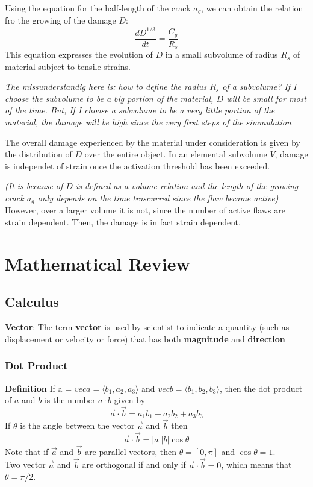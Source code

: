 \documentclass[10pt, twocolumn]{thesis}
\begin{document}
Using the equation for the half-length of the crack $a_g$, we can obtain the relation fro the growing of the damage $D$:
\[\frac{dD^{1/3}}{dt}=\frac{C_g}{R_s}\]
This equation expresses the evolution of $D$ in a small subvolume of radius $R_s$ of material subject to tensile strains.
\begin{scriptsize}
\textit{The missunderstandig here is: how to define the radius $R_s$ of a subvolume? If I choose the subvolume to be a big portion of the material, $D$ will be small for most of the time. But, If I choose a subvolume to be a very little portion of the material, the damage will be high since the very first steps of the simmulation}
\end{scriptsize}
The overall damage experienced by the material under consideration is given by the distribution of $D$ over the entire object. In an elemental subvolume $V$, damage is independet of strain once the activation threshold has been exceeded.
\begin{scriptsize}
\textit{(It is because of $D$ is defined as a volume relation and the length of the growing crack $a_g$ only depends on the time trascurred since the flaw became active)} However, over a larger volume it is not, since the number of active flaws are strain dependent. Then, the damage is in fact strain dependent.
\end{scriptsize}
\part{Mathematical Review}
\chapter{Calculus}
\textbf{Vector}: The term \textbf{vector} is used by scientist to indicate a quantity (such as displacement or velocity or force) that has both \textbf{magnitude} and \textbf{direction}\cite{S_calculus}
\section{Dot Product}
\textbf{Definition} If a = $vec{a}=\langle b_1,a_2,a_3\rangle$ and $vec{b}=\langle b_1,b_2,b_3\rangle$, then the dot product of $a$ and $b$ is the number $a\cdot b$ given by
\[\vec{a}\cdot\vec{b}=a_1b_1+a_2b_2+a_3b_3\]
If $\theta$ is the angle between the vector $\vec{a}$ and $\vec{b}$ then
\[\vec{a}\cdot\vec{b}=|a||b|\cos{\theta}\]
Note that if $\vec{a}$ and $\vec{b}$ are parallel vectors, then $\theta=[0, \pi]$ and $\cos{\theta}=1$.\\
Two vector $\vec{a}$ and $\vec{b}$ are orthogonal if and only if $\vec{a}\cdot\vec{b}=0$, which means that $\theta=\pi/2$.
\end{document}
